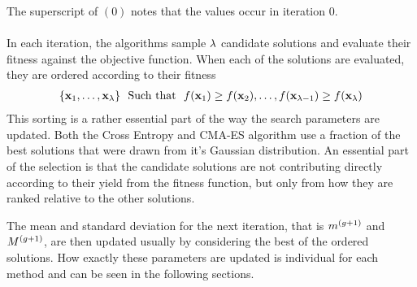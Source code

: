 The superscript of $(0)$ notes that the values occur in iteration 0.\\
\\
In each iteration, the algorithms sample $\lambda$ candidate solutions 
and evaluate their fitness
against the objective function. When each of the solutions are evaluated,
they are ordered according to their fitness
\begin{align}
\{\textbf{\individual }_{1}, \hdots, 
\textbf{\individual }_{\populationSize }\}\ \ \text{Such that}\ \ 
\fitnessFunction(\textbf{x}_1) \geq 
\fitnessFunction(\textbf{\individual }_2), \hdots, 
\fitnessFunction(\textbf{\individual }_{\populationSize  - 1}) \geq 
\fitnessFunction(\textbf{\individual }_{\populationSize })
\end{align}
This sorting is a rather essential part of the way the search parameters are
updated. Both the Cross Entropy and CMA-ES algorithm use a fraction of the 
best solutions that were drawn from it's Gaussian distribution. An essential 
part of the selection is that the candidate solutions are not contributing
directly according to their yield from the fitness function, but only from 
how they are ranked relative to the other solutions. 

The mean and standard deviation for the next iteration, 
that is $m^{(g+1)}$ and $M^{(g+1)}$, are
then updated usually by considering the best of the ordered solutions. How exactly
these parameters are updated is individual for each method and can be seen in the following
sections.


